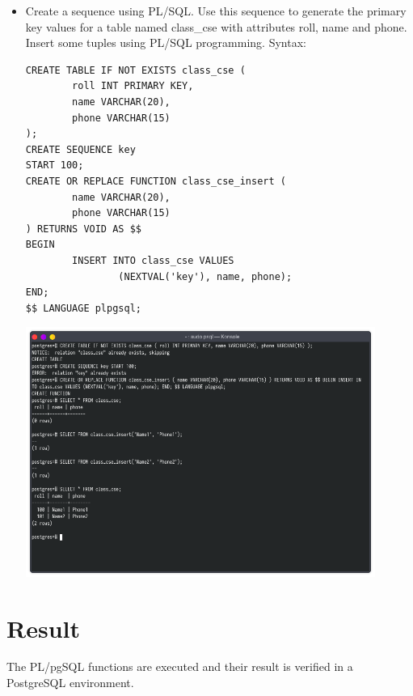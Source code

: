 \documentclass[13pt,oneside]{book}
\begin{document}
\begin{itemize}
\item
Create a sequence using PL/SQL. Use this sequence to generate the primary key
 values for a table named class\_cse with attributes roll, name and phone. Insert some
 tuples using PL/SQL programming.
Syntax:
\begin{verbatim}
CREATE TABLE IF NOT EXISTS class_cse (
        roll INT PRIMARY KEY,
        name VARCHAR(20),
        phone VARCHAR(15)
);
CREATE SEQUENCE key
START 100;
CREATE OR REPLACE FUNCTION class_cse_insert (
        name VARCHAR(20),
        phone VARCHAR(15)
) RETURNS VOID AS $$
BEGIN
        INSERT INTO class_cse VALUES 
                (NEXTVAL('key'), name, phone);
END;
$$ LANGUAGE plpgsql;
\end{verbatim}
\includegraphics[width=0.9\textwidth]{img/p8/ss6.png}
	
\end{itemize}
\section*{Result}
	The PL/pgSQL functions are executed and their result
	is verified in a PostgreSQL environment.
\end{document}
